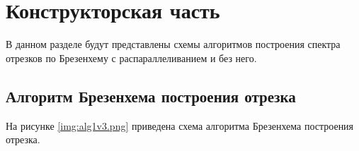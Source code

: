 \chapter{Конструкторская часть}
В данном разделе будут представлены схемы алгоритмов построения спектра отрезков по Брезенхему с распараллеливанием и без него.
 

\section{Алгоритм Брезенхема построения отрезка}

На рисунке \ref{img:alg1v3.png} приведена схема алгоритма Брезенхема построения отрезка.
\\
\\
\\
\\
\\
\\
\\
\\
\\
\\
\\
\\
\\
\\
\\
\\
\\
\\
\\
\\
\\
\\



\FloatBarrier
